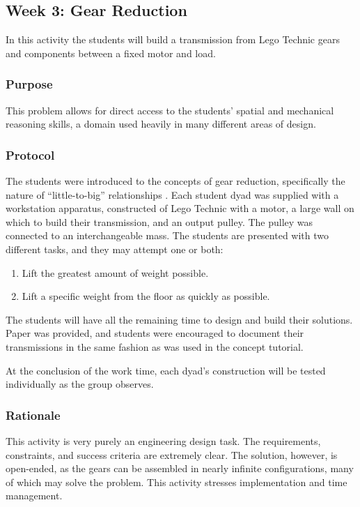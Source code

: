 \subsection{Week 3: Gear Reduction}

	In this activity the students will build a transmission from Lego
	Technic gears and components between a fixed motor and load. 
	
	
	\subsubsection{Purpose}
	
	This problem allows for direct access to the students' spatial and
	mechanical reasoning skills, a domain used heavily in many different
	areas of design.
	
	
	\subsubsection{Protocol}
	
	The students were introduced to the concepts of gear reduction,
	specifically the nature of {}``little-to-big'' relationships \citet{ArtofLEGO}.
	Each student dyad was supplied with a workstation apparatus, constructed
	of Lego Technic with a motor, a large wall on which to build their
	transmission, and an output pulley. The pulley was connected to
	an interchangeable mass. The students are presented with two different
	tasks, and they may attempt one or both:
	\begin{enumerate}
	\item Lift the greatest amount of weight possible.
	\item Lift a specific weight from the floor as quickly as possible.
	\end{enumerate}
	The students will have all the remaining time to design and build
	their solutions. Paper was provided, and students were encouraged
	to document their transmissions in the same fashion as was used in
	the concept tutorial.
	
	At the conclusion of the work time, each dyad's construction will
	be tested individually as the group observes.
	
	
	\subsubsection{Rationale}
	
	This activity is very purely an engineering design task. The requirements,
	constraints, and success criteria are extremely clear. The solution,
	however, is open-ended, as the gears can be assembled in nearly infinite
	configurations, many of which may solve the problem. This activity
	stresses implementation and time management.

